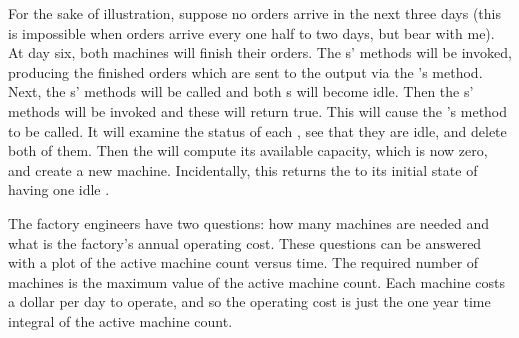 For the sake of illustration, suppose no orders arrive in the next three days (this is impossible when orders arrive every one half to two days, but bear with me). At day six, both machines will finish their orders. The s'  methods will be invoked, producing the finished orders which are sent to the  output via the 's  method. Next, the s'  methods will be called and both s will become idle. Then the s'  methods will be invoked and these will return true. This will cause the 's  method to be called. It will examine the status of each , see that they are idle, and delete both of them. Then the  will compute its available capacity, which is now zero, and create a new machine. Incidentally, this returns the  to its initial state of having one idle .
 
The factory engineers have two questions: how many machines are needed and what is the factory's annual operating cost. These questions can be answered with a plot of the active machine count versus time. The required number of machines is the maximum value of the active machine count. Each machine costs a dollar per day to operate, and so the operating cost is just the one year time integral of the active machine count. 


